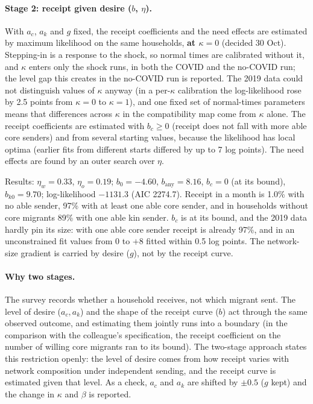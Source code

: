 \documentclass[11pt]{article}
\begin{document}
\paragraph{Stage 2: receipt given desire ($b$, $\eta$).} With $a_c$, $a_k$ and $g$ fixed, the receipt coefficients and the need effects are estimated by maximum likelihood on the same households, \textbf{at $\kappa = 0$} (decided 30 Oct). Stepping-in is a response to the shock, so normal times are calibrated without it, and $\kappa$ enters only the shock runs, in both the COVID and the no-COVID run; the level gap this creates in the no-COVID run is reported. The 2019 data could not distinguish values of $\kappa$ anyway (in a per-$\kappa$ calibration the log-likelihood rose by 2.5 points from $\kappa = 0$ to $\kappa = 1$), and one fixed set of normal-times parameters means that differences across $\kappa$ in the compatibility map come from $\kappa$ alone. The receipt coefficients are estimated with $b_c \ge 0$ (receipt does not fall with more able core senders) and from several starting values, because the likelihood has local optima (earlier fits from different starts differed by up to 7 log points). The need effects are found by an outer search over $\eta$.

Results: $\eta_w = 0.33$, $\eta_o = 0.19$; $b_0 = -4.60$, $b_{\text{any}} = 8.16$, $b_c = 0$ (at its bound), $b_{k0} = 9.70$; log-likelihood $-1131.3$ (AIC 2274.7). Receipt in a month is 1.0\% with no able sender, 97\% with at least one able core sender, and in households without core migrants 89\% with one able kin sender. $b_c$ is at its bound, and the 2019 data hardly pin its size: with one able core sender receipt is already 97\%, and in an unconstrained fit values from 0 to $+8$ fitted within 0.5 log points. The network-size gradient is carried by desire ($g$), not by the receipt curve.

\paragraph{Why two stages.} The survey records whether a household receives, not which migrant sent. The level of desire ($a_c, a_k$) and the shape of the receipt curve ($b$) act through the same observed outcome, and estimating them jointly runs into a boundary (in the comparison with the colleague's specification, the receipt coefficient on the number of willing core migrants ran to its bound). The two-stage approach states this restriction openly: the level of desire comes from how receipt varies with network composition under independent sending, and the receipt curve is estimated given that level. As a check, $a_c$ and $a_k$ are shifted by $\pm 0.5$ ($g$ kept) and the change in $\kappa$ and $\beta$ is reported.
\end{document}
